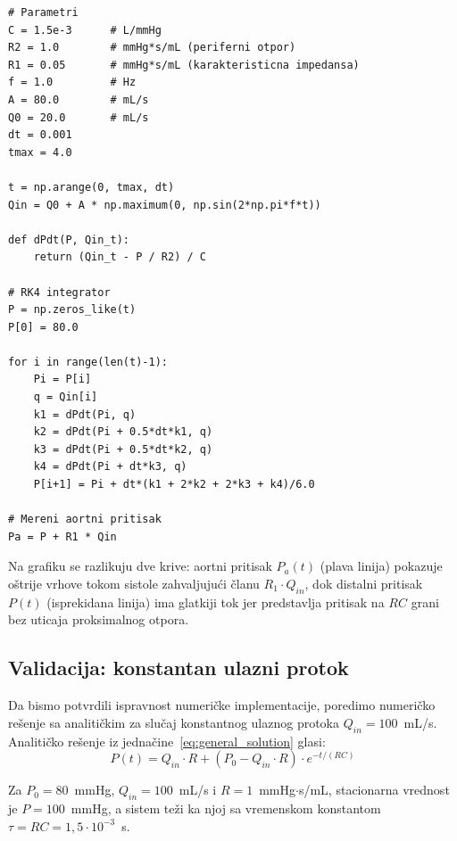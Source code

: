 \documentclass[12pt,a4paper]{article}
\begin{document}
\begin{lstlisting}[caption={Simulacija troelementnog modela (RK4 metoda)}]
# Parametri
C = 1.5e-3      # L/mmHg
R2 = 1.0        # mmHg*s/mL (periferni otpor)
R1 = 0.05       # mmHg*s/mL (karakteristicna impedansa)
f = 1.0         # Hz
A = 80.0        # mL/s
Q0 = 20.0       # mL/s
dt = 0.001
tmax = 4.0

t = np.arange(0, tmax, dt)
Qin = Q0 + A * np.maximum(0, np.sin(2*np.pi*f*t))

def dPdt(P, Qin_t):
    return (Qin_t - P / R2) / C

# RK4 integrator
P = np.zeros_like(t)
P[0] = 80.0

for i in range(len(t)-1):
    Pi = P[i]
    q = Qin[i]
    k1 = dPdt(Pi, q)
    k2 = dPdt(Pi + 0.5*dt*k1, q)
    k3 = dPdt(Pi + 0.5*dt*k2, q)
    k4 = dPdt(Pi + dt*k3, q)
    P[i+1] = Pi + dt*(k1 + 2*k2 + 2*k3 + k4)/6.0

# Mereni aortni pritisak
Pa = P + R1 * Qin
\end{lstlisting}


Na grafiku se razlikuju dve krive: aortni pritisak $P_a(t)$ (plava linija) pokazuje oštrije vrhove tokom sistole zahvaljujući članu $R_1 \cdot Q_{in}$, dok distalni pritisak $P(t)$ (isprekidana linija) ima glatkiji tok jer predstavlja pritisak na $RC$ grani bez uticaja proksimalnog otpora.


\subsection{Validacija: konstantan ulazni protok}

Da bismo potvrdili ispravnost numeričke implementacije, poredimo numeričko rešenje sa analitičkim za slučaj konstantnog ulaznog protoka $Q_{in} = 100$~mL/s. Analitičko rešenje iz jednačine~\eqref{eq:general_solution} glasi:
\begin{equation}
    P(t) = Q_{in} \cdot R + (P_0 - Q_{in} \cdot R) \cdot e^{-t/(RC)}
\end{equation}

Za $P_0 = 80$~mmHg, $Q_{in} = 100$~mL/s i $R = 1$~mmHg$\cdot$s/mL, stacionarna vrednost je $P = 100$~mmHg, a sistem teži ka njoj sa vremenskom konstantom $\tau = RC = 1{,}5 \cdot 10^{-3}$~s.
\end{document}
